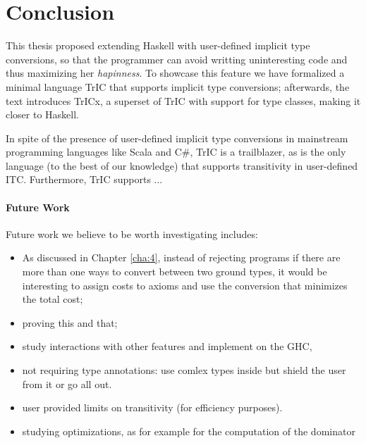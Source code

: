 \chapter{Conclusion}
\label{cha:conclusion}
This thesis proposed extending Haskell with user-defined implicit type conversions, so that the programmer can avoid writting uninteresting code and thus maximizing her \textit{hapinness}. To showcase this feature we have formalized a minimal language TrIC that supports implicit type conversions; afterwards, the text introduces TrICx, a superset of TrIC with support for type classes, making it closer to Haskell.

In spite of the presence of user-defined implicit type conversions in mainstream programming languages like Scala and C\#, TrIC is a trailblazer, as is the only language (to the best of our knowledge) that supports transitivity in user-defined ITC. Furthermore, TrIC supports ...
\subsubsection{Future Work}
Future work we believe to be worth investigating includes:
\begin{itemize}
\item As discussed in Chapter \ref{cha:4}, instead of rejecting programs if there are more than one ways to convert between two ground types, it would be interesting to assign costs to axioms and use the conversion that minimizes the total cost;
\item proving this and that;
\item study interactions with other features and implement on the GHC,
\item not requiring type annotations: use comlex types inside but shield the user from it or go all out.
\item user provided limits on transitivity (for efficiency purposes).
  \item studying optimizations, as for example for the computation of the dominator \cite{tarjan}
\end{itemize}


